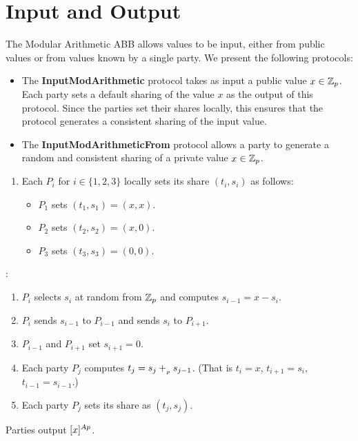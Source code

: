 \section{Input and Output}

The Modular Arithmetic ABB allows values to be input, either from public values or from values known by a single party.
We present the following protocols:
\begin{itemize}
    \item The {\bf InputModArithmetic} protocol takes as input a public value $x \in \mathbb{Z}_p$.
    Each party sets a default sharing of the value $x$ as the output of this protocol. 
    Since the parties set their shares locally, this ensures that the protocol generates a consistent sharing of the input value.
    \item The {\bf InputModArithmeticFrom} protocol allows a party to generate a random and consistent sharing of a private value $x \in \mathbb{Z}_p$.
\end{itemize}

\begin{protocol}[Input]
	\begin{enumerate}
        \item Each $P_i$ for $i \in \{1, 2, 3\}$ locally sets its share $(t_i, s_i)$ as follows:
        \begin{itemize}
            \item $P_1$ sets $(t_1, s_1) = (x, x)$.
            \item $P_2$ sets $(t_2, s_2) = (x, 0)$.
            \item $P_3$ sets $(t_3, s_3) = (0, 0)$. 
        \end{itemize}
	\end{enumerate}

	\noindent {}:
	\begin{enumerate}
		\item $P_i$ selects $s_i$ at random from $\mathbb{Z}_p$ and computes $s_{i - 1} = x - s_i$.
		\item $P_i$ sends $s_{i - 1}$ to $P_{i - 1}$ and sends $s_i$ to $P_{i + 1}$.
		\item $P_{i-1}$ and $P_{i+1}$ set $s_{i+1} = 0$.
		\item Each party $P_j$ computes $t_j = s_j +_{_p} s_{j - 1}$.
			(That is $t_i = x$, $t_{i + 1} = s_{i}$, $t_{i - 1} = s_{i - 1}$.)
		\item Each party $P_j$ sets its share as $(t_j, s_j)$.
	\end{enumerate}
		Parties output $[x]^{Ap}$.
\end{protocol}

